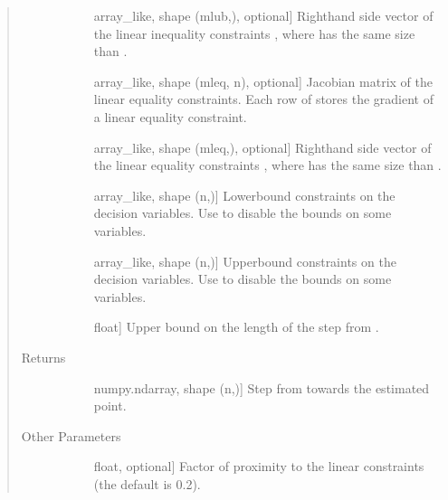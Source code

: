 \documentclass[letterpaper,10pt,english]{sphinxmanual}
\begin{document}
\begin{fulllineitems}
\begin{quote}
\begin{description}
\begin{description}
\item[{}] \leavevmode{[}array\_like, shape (mlub,), optional{]}
\sphinxAtStartPar
Right\sphinxhyphen{}hand side vector of the linear inequality constraints
, where  has the same size than .

\item[{}] \leavevmode{[}array\_like, shape (mleq, n), optional{]}
\sphinxAtStartPar
Jacobian matrix of the linear equality constraints. Each row of 
stores the gradient of a linear equality constraint.

\item[{}] \leavevmode{[}array\_like, shape (mleq,), optional{]}
\sphinxAtStartPar
Right\sphinxhyphen{}hand side vector of the linear equality constraints
, where  has the same size than .

\item[{}] \leavevmode{[}array\_like, shape (n,){]}
\sphinxAtStartPar
Lower\sphinxhyphen{}bound constraints on the decision variables. Use  to
disable the bounds on some variables.

\item[{}] \leavevmode{[}array\_like, shape (n,){]}
\sphinxAtStartPar
Upper\sphinxhyphen{}bound constraints on the decision variables. Use  to
disable the bounds on some variables.

\item[{}] \leavevmode{[}float{]}
\sphinxAtStartPar
Upper bound on the length of the step from .

\end{description}

\item[{Returns}] \leavevmode\begin{description}
\item[{}] \leavevmode{[}numpy.ndarray, shape (n,){]}
\sphinxAtStartPar
Step from  towards the estimated point.

\end{description}

\item[{Other Parameters}] \leavevmode\begin{description}
\item[{}] \leavevmode{[}float, optional{]}
\sphinxAtStartPar
Factor of proximity to the linear constraints (the default is 0.2).


\end{description}
\end{description}
\end{quote}
\end{fulllineitems}
\end{document}
